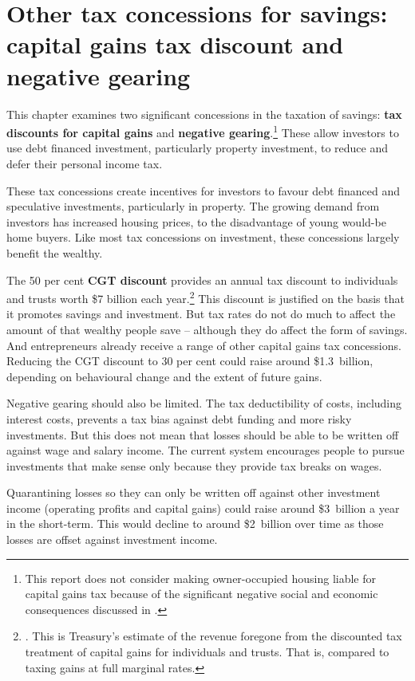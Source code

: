 \documentclass{grattan}\usepackage[]{graphicx}\usepackage[]{color}
\newcommand{\highlight}[1]{\textbf{#1}}
\begin{document}
\setcounter{tocdepth}{1}
\contentspage

\chapter{Other tax concessions for savings: capital gains tax discount and negative gearing}
This chapter examines two significant concessions in the taxation of savings: \highlight{tax discounts for capital gains} and \highlight{negative gearing}.\footnote{This report does not consider making owner-occupied housing liable for capital gains tax because of the significant negative social and economic consequences discussed in \textcite[pp.~43-45]{Daley2013}.}  These allow investors to use debt financed investment, particularly property investment, to reduce and defer their personal income tax.

These tax concessions create incentives for investors to favour debt financed and speculative investments, particularly in property. The growing demand from investors has increased housing prices, to the disadvantage of young would-be home buyers. Like most tax concessions on investment, these concessions largely benefit the wealthy. 

The 50 per cent \highlight{CGT discount} provides an annual tax discount to individuals and trusts worth \$7 billion each year.\footnote{\textcite[p.4-21]{Treasury2015a}. This is Treasury's estimate of the revenue foregone from the discounted tax treatment of capital gains for individuals and trusts. That is, compared to taxing gains at full marginal rates.} This discount is justified on the basis that it promotes savings and investment. But tax rates do not do much to affect the amount of that wealthy people save -- although they do affect the form of savings. And entrepreneurs already receive a range of other capital gains tax concessions. Reducing the CGT discount to 30 per cent could raise around \$1.3~billion, depending on behavioural change and the extent of future gains.

Negative gearing should also be limited. The tax deductibility of costs, including interest costs, prevents a tax bias against debt funding and more risky investments. But this does not mean that losses should be able to be written off against wage and salary income. The current system encourages people to pursue investments that make sense only because they provide tax breaks on wages.

Quarantining losses so they can only be written off against other investment income (operating profits and capital gains) could raise around \$3~billion a year in the short-term. This would decline to around \$2~billion over time as those losses are offset against investment income.  
\end{document}
